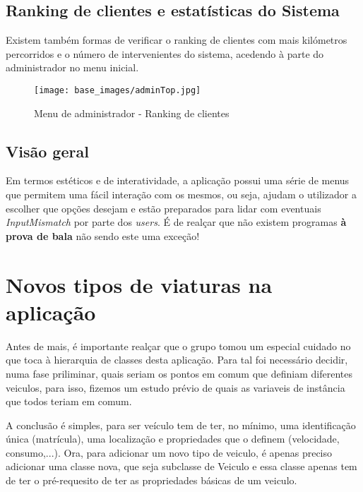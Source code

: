 \documentclass[a4paper,11pt]{report}
\begin{document}
\section{Ranking de clientes e estatísticas do Sistema}

\hspace{0.5cm} Existem também formas de verificar o ranking de clientes com mais kilómetros percorridos e o número de intervenientes do sistema, acedendo à parte do administrador no menu inicial.

   \begin{figure}[H]
        \centering
        \texttt{[image: base\_images/adminTop.jpg]}
        \label{img:logo}
        \caption{Menu de administrador - Ranking de clientes}
    \end{figure}

\section{Visão geral}
\vspace{0.5cm}
\par \hspace{0.5cm} Em termos estéticos e de interatividade, a aplicação possui uma série de menus que permitem uma fácil interação com os mesmos, ou seja, ajudam o utilizador a escolher que opções desejam e estão preparados para lidar com eventuais \textit{InputMismatch} por parte dos \textit{users}. É de realçar que não existem programas \textbf{à prova de bala} não sendo este uma exceção!

\chapter{Novos tipos de viaturas na aplicação}

\hspace{0.50cm} Antes de mais, é importante realçar que o grupo tomou um especial cuidado no que toca à hierarquia de classes desta aplicação. Para tal foi necessário decidir, numa fase priliminar, quais seriam os pontos em comum que definiam diferentes veiculos, para isso, fizemos um estudo prévio de quais as variaveis de instância que todos teriam em comum.

\vspace{0.5cm}

A conclusão é simples, para ser veículo tem de ter, no mínimo, uma identificação única (matrícula), uma localização e propriedades que o definem (velocidade, consumo,...). Ora, para adicionar um novo tipo de veiculo, é apenas preciso adicionar uma classe nova, que seja subclasse de Veiculo e essa classe apenas tem de ter o pré-requesito de ter as propriedades básicas de um veiculo.
\end{document}
